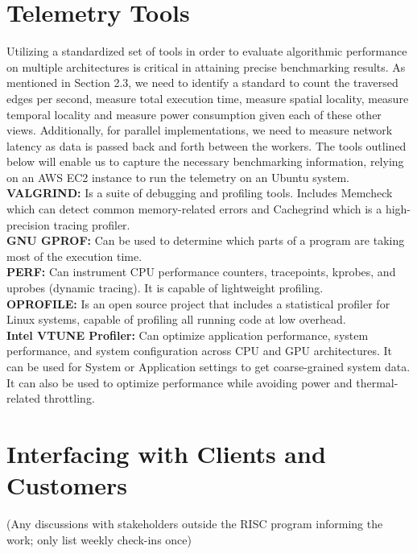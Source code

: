 \documentclass[letterpaper, 10pt]{article}
\begin{document}
\begin{multicols}{2}
    \section{Telemetry Tools}
        Utilizing a standardized set of tools in order to evaluate algorithmic performance on multiple architectures is critical in attaining precise benchmarking results. As mentioned in Section 2.3, we need to identify a standard to count the traversed edges per second, measure total execution time, measure spatial locality, measure temporal locality and measure power consumption given each of these other views. Additionally, for parallel implementations, we need to measure network latency as data is passed back and forth between the workers. The tools outlined below will enable us to capture the necessary benchmarking information, relying on an AWS EC2 instance to run the telemetry on an Ubuntu system. \\
        \noindent
        \newline
        \textbf{VALGRIND:}
         Is a suite of debugging and profiling tools. Includes Memcheck which can detect common memory-related errors and Cachegrind which is a high-precision tracing profiler. \\  
        \noindent
        \newline
        \textbf{GNU GPROF:}  Can be used to determine which parts of a program are taking most of the execution time. \\
        \noindent
        \newline
        \textbf{PERF:}  Can instrument CPU performance counters, tracepoints, kprobes, and uprobes (dynamic tracing). It is capable of lightweight profiling. \\
        \noindent
        \newline
        \textbf{OPROFILE:}  Is an open source project that includes a statistical profiler for Linux systems, capable of profiling all running code at low overhead.\\
        \noindent
        \newline
        \textbf{Intel VTUNE Profiler:} Can optimize application performance, system performance, and system configuration across CPU and GPU architectures. It can be used for System or Application settings to get coarse-grained system data. It can also be used to optimize performance while avoiding power and thermal-related throttling. \\
       
    \section{Interfacing with Clients and Customers}
        (Any discussions with stakeholders outside the RISC  program informing the work; only list weekly check-ins  once) \\
        

\end{multicols}
\end{document}
